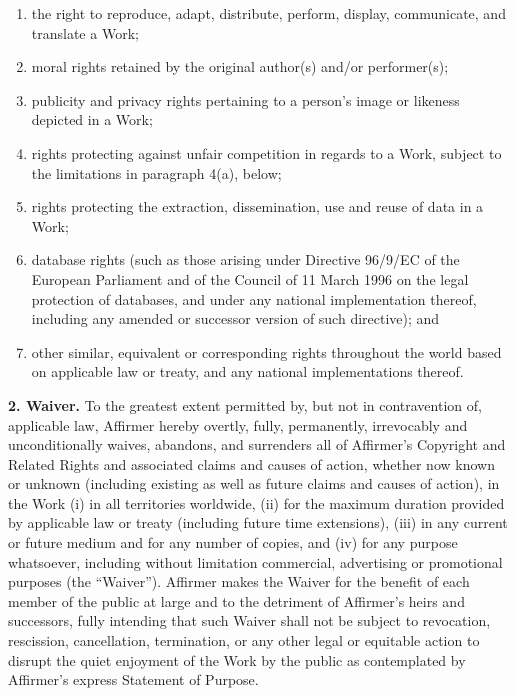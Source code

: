 \begin{enumerate}[label=\roman*.]
  
  \item the right to reproduce, adapt, distribute, perform,
  display, communicate, and translate a Work;
  
  \item  moral rights retained by the original author(s) and/or
  performer(s);
  
  \item publicity and privacy rights pertaining to a person's
  image or likeness depicted in a Work;
  
  \item rights protecting against unfair competition in regards
  to a Work, subject to the limitations in paragraph 4(a),
  below;
  
  \item rights protecting the extraction, dissemination, use and
  reuse of data in a Work;
  
  \item database rights (such as those arising under Directive
  96/9/EC of the European Parliament and of the Council of 11
  March 1996 on the legal protection of databases, and under
  any national implementation thereof, including any amended
  or successor version of such directive); and
  
  \item other similar, equivalent or corresponding rights
  throughout the world based on applicable law or treaty, and
  any national implementations thereof.

\end{enumerate}

\noindent \textbf{2. Waiver.} To the greatest extent
permitted by, but not in contravention of, applicable law,
Affirmer hereby overtly, fully, permanently, irrevocably and
unconditionally waives, abandons, and surrenders all of
Affirmer's Copyright and Related Rights and associated claims
and causes of action, whether now known or unknown (including
existing as well as future claims and causes of action), in
the Work (i) in all territories worldwide, (ii) for the
maximum duration provided by applicable law or treaty
(including future time extensions), (iii) in any current or
future medium and for any number of copies, and (iv) for any
purpose whatsoever, including without limitation commercial,
advertising or promotional purposes (the ``Waiver''). Affirmer
makes the Waiver for the benefit of each member of the public
at large and to the detriment of Affirmer's heirs and
successors, fully intending that such Waiver shall not be
subject to revocation, rescission, cancellation, termination,
or any other legal or equitable action to disrupt the quiet
enjoyment of the Work by the public as contemplated by
Affirmer's express Statement of Purpose.


